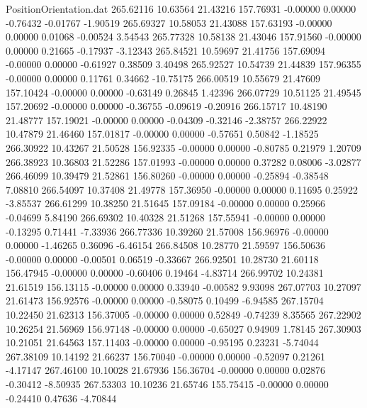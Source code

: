 \begin{filecontents}{PositionOrientation.dat}
 265.62116   10.63564   21.43216   157.76931   -0.00000    0.00000   -0.76432   -0.01767   -1.90519
 265.69327   10.58053   21.43088   157.63193   -0.00000    0.00000    0.01068   -0.00524    3.54543
 265.77328   10.58138   21.43046   157.91560   -0.00000    0.00000    0.21665   -0.17937   -3.12343
 265.84521   10.59697   21.41756   157.69094   -0.00000    0.00000   -0.61927    0.38509    3.40498
 265.92527   10.54739   21.44839   157.96355   -0.00000    0.00000    0.11761    0.34662  -10.75175
 266.00519   10.55679   21.47609   157.10424   -0.00000    0.00000   -0.63149    0.26845    1.42396
 266.07729   10.51125   21.49545   157.20692   -0.00000    0.00000   -0.36755   -0.09619   -0.20916
 266.15717   10.48190   21.48777   157.19021   -0.00000    0.00000   -0.04309   -0.32146   -2.38757
 266.22922   10.47879   21.46460   157.01817   -0.00000    0.00000   -0.57651    0.50842   -1.18525
 266.30922   10.43267   21.50528   156.92335   -0.00000    0.00000   -0.80785    0.21979    1.20709
 266.38923   10.36803   21.52286   157.01993   -0.00000    0.00000    0.37282    0.08006   -3.02877
 266.46099   10.39479   21.52861   156.80260   -0.00000    0.00000   -0.25894   -0.38548    7.08810
 266.54097   10.37408   21.49778   157.36950   -0.00000    0.00000    0.11695    0.25922   -3.85537
 266.61299   10.38250   21.51645   157.09184   -0.00000    0.00000    0.25966   -0.04699    5.84190
 266.69302   10.40328   21.51268   157.55941   -0.00000    0.00000   -0.13295    0.71441   -7.33936
 266.77336   10.39260   21.57008   156.96976   -0.00000    0.00000   -1.46265    0.36096   -6.46154
 266.84508   10.28770   21.59597   156.50636   -0.00000    0.00000   -0.00501    0.06519   -0.33667
 266.92501   10.28730   21.60118   156.47945   -0.00000    0.00000   -0.60406    0.19464   -4.83714
 266.99702   10.24381   21.61519   156.13115   -0.00000    0.00000    0.33940   -0.00582    9.93098
 267.07703   10.27097   21.61473   156.92576   -0.00000    0.00000   -0.58075    0.10499   -6.94585
 267.15704   10.22450   21.62313   156.37005   -0.00000    0.00000    0.52849   -0.74239    8.35565
 267.22902   10.26254   21.56969   156.97148   -0.00000    0.00000   -0.65027    0.94909    1.78145
 267.30903   10.21051   21.64563   157.11403   -0.00000    0.00000   -0.95195    0.23231   -5.74044
 267.38109   10.14192   21.66237   156.70040   -0.00000    0.00000   -0.52097    0.21261   -4.17147
 267.46100   10.10028   21.67936   156.36704   -0.00000    0.00000    0.02876   -0.30412   -8.50935
 267.53303   10.10236   21.65746   155.75415   -0.00000    0.00000   -0.24410    0.47636   -4.70844

\end{filecontents}
